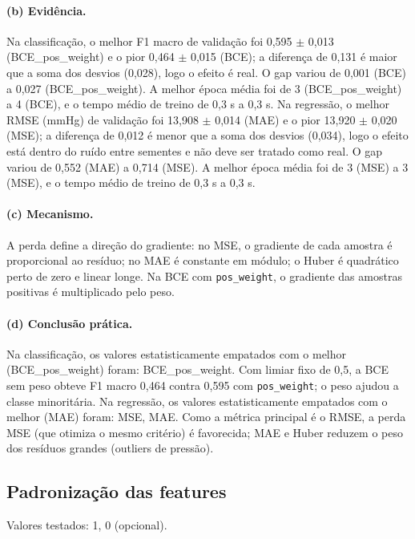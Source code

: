 \documentclass[11pt,a4paper]{article}
\begin{document}
\paragraph{(b) Evidência.} Na classificação, o melhor F1 macro de validação foi 0,595 $\pm$ 0,013 (BCE\_pos\_weight) e o pior 0,464 $\pm$ 0,015 (BCE); a diferença de 0,131 é maior que a soma dos desvios (0,028), logo o efeito é real. O gap variou de 0,001 (BCE) a 0,027 (BCE\_pos\_weight). A melhor época média foi de 3 (BCE\_pos\_weight) a 4 (BCE), e o tempo médio de treino de 0,3 s a 0,3 s. Na regressão, o melhor RMSE (mmHg) de validação foi 13,908 $\pm$ 0,014 (MAE) e o pior 13,920 $\pm$ 0,020 (MSE); a diferença de 0,012 é menor que a soma dos desvios (0,034), logo o efeito está dentro do ruído entre sementes e não deve ser tratado como real. O gap variou de 0,552 (MAE) a 0,714 (MSE). A melhor época média foi de 3 (MSE) a 3 (MSE), e o tempo médio de treino de 0,3 s a 0,3 s.

\paragraph{(c) Mecanismo.} A perda define a direção do gradiente: no MSE, o gradiente de cada amostra é proporcional ao resíduo; no MAE é constante em módulo; o Huber é quadrático perto de zero e linear longe. Na BCE com \texttt{pos\_weight}, o gradiente das amostras positivas é multiplicado pelo peso.

\paragraph{(d) Conclusão prática.} Na classificação, os valores estatisticamente empatados com o melhor (BCE\_pos\_weight) foram: BCE\_pos\_weight. Com limiar fixo de 0,5, a BCE sem peso obteve F1 macro 0,464 contra 0,595 com \texttt{pos\_weight}; o peso ajudou a classe minoritária. Na regressão, os valores estatisticamente empatados com o melhor (MAE) foram: MSE, MAE. Como a métrica principal é o RMSE, a perda MSE (que otimiza o mesmo critério) é favorecida; MAE e Huber reduzem o peso dos resíduos grandes (outliers de pressão).

\subsection{Padronização das features}
Valores testados: 1, 0 (opcional).
\end{document}
